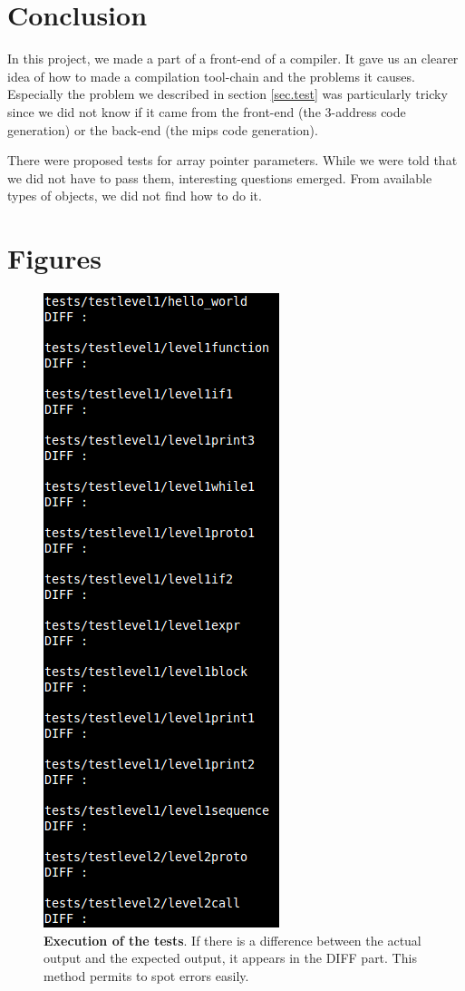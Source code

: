 \documentclass[a4paper,11pt,english]{article}
\begin{document}
\section{Conclusion}
In this project, we made a part of a front-end of a compiler.
It gave us an clearer idea of how to made a compilation tool-chain and the problems it causes.
Especially the problem we described in section \ref{sec.test} was particularly tricky since we did not know if it came from the front-end (the 3-address code generation) or the back-end (the mips code generation).

There were proposed tests for array pointer parameters.
While we were told that we did not have to pass them, interesting questions emerged.
From available types of objects, we did not find how to do it.

\appendix
\section{Figures}
\begin{figure}[H]
\centering
\includegraphics[scale=0.5]{tests}
\caption{
  \textbf{Execution of the tests}.
  If there is a difference between the actual output and the expected output, it appears in the DIFF part.
  This method permits to spot errors easily.}
  \label{fig.test}
\end{figure}
\end{document}
